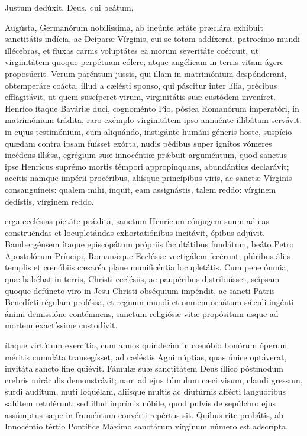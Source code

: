 \documentclass[fontsize=9pt,paper=A6,twoside,BCOR=1mm,DIV=22,headinclude]{scrarticle}
\begin{document}
\begin{multicols}{2}
{\V Justum dedúxit,  Deus, qui beátum, 



 Augústa, Germanórum nobilíssima, ab ineúnte ætáte præclára exhíbuit sanctitátis indícia, ac Deíparæ Vírginis, cui se totam addíxerat, patrocínio mundi illécebras, et fluxas carnis voluptátes ea morum severitáte coércuit, ut virginitátem quoque perpétuam cólere, atque angélicam in terris vitam ágere proposúerit. Verum paréntum jussis, qui illam in matrimónium despónderant, obtemperáre coácta, illud a cælésti sponso, qui páscitur inter lília, précibus efflagitávit, ut quem suscíperet virum, virginitátis suæ custódem inveníret. Henríco ítaque Baváriæ duci, cognoménto Pio, póstea Romanórum imperatóri, in matrimónium trádita, raro exémplo virginitátem ipso annuénte illibátam servávit: in cujus testimónium, cum aliquándo, instigánte humáni géneris hoste, suspício quædam contra ipsam fuísset exórta, nudis pédibus super ignítos vómeres incédens ill\'æsa, egrégium suæ innocéntiæ pr\'æbuit arguméntum, quod sanctus ipse Henrícus suprémo mortis témpori appropínquans, abundántius declarávit; accítis namque impérii procéribus, aliísque princípibus viris, ac sanctæ Vírginis consanguíneis: qualem mihi, inquit, eam assignástis, talem reddo: vírginem dedístis, vírginem reddo.

\RVViv

 erga ecclésias pietáte pr\'ædita, sanctum Henrícum cónjugem suum ad eas construéndas et locupletándas exhortatiónibus incitávit, ópibus adjúvit. Bambergénsem ítaque episcopátum própriis facultátibus fundátum, beáto Petro Apostolórum Príncipi, Roman\'æque Ecclésiæ vectigálem fecérunt, plúribus áliis templis et cœnóbiis cæsaréa plane munificéntia locupletátis. Cum pene ómnia, quæ habébat in terris, Christi ecclésiis, ac paupéribus distribuísset, seípsam quoque defúncto viro in Jesu Christi obséquium impéndit, ac sancti Patris Benedícti régulam proféssa, et regnum mundi et omnem ornátum s\'æculi ingénti ánimi demissióne contémnens, sanctum religiósæ vitæ propósitum usque ad mortem exactíssime custodívit.

\RVVv 

 ítaque virtútum exercítio, cum annos quíndecim in cœnóbio bonórum óperum méritis cumuláta transegísset, ad cæléstis Agni núptias, quas únice optáverat, invitáta sancto fine quiévit. Fámulæ suæ sanctitátem Deus íllico póstmodum crebris miráculis demonstrávit; nam ad ejus túmulum cæci visum, claudi gressum, surdi audítum, muti loquélam, aliísque multis ac diutúrnis affécti languóribus salútem retulérunt; sed illud inprímis nóbile, quod pulvis de sepúlchro ejus assúmptus sæpe in fruméntum convérti repértus sit. Quibus rite probátis, ab Innocéntio tértio Pontífice Máximo sanctárum vírginum número est adscrípta.

}
\end{multicols}
\end{document}
